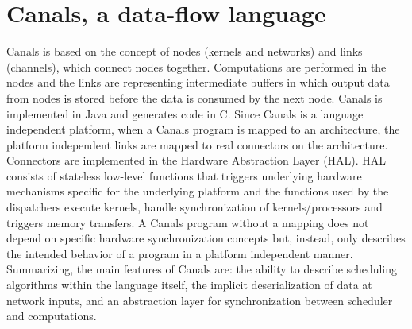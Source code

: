 \documentclass[[10pt,abbrv]{llncs}
\begin{document}
\section{Canals, a data-flow language}
Canals \cite{canals} is based on the concept of nodes (kernels and networks) and links (channels), which connect nodes together. Computations are performed in the nodes and the links are representing intermediate buffers in which output data from nodes is stored before the data is consumed by the next node. Canals is implemented in Java and generates code in C. Since Canals is a language independent platform, when a Canals program is mapped to an architecture, the platform independent links are mapped to real connectors on the architecture. Connectors are implemented in the Hardware Abstraction Layer (HAL). HAL consists of stateless low-level functions that triggers underlying hardware mechanisms specific for the underlying platform and the functions used by the dispatchers execute kernels, handle synchronization of kernels/processors and triggers memory transfers. A Canals program without a mapping does not depend on specific hardware synchronization concepts but, instead, only describes the intended behavior of a program in a platform independent manner. Summarizing, the main features of Canals are: the ability to describe scheduling algorithms within the language itself, the implicit deserialization of data at network inputs, and an abstraction layer for synchronization between scheduler and computations.
\end{document}
